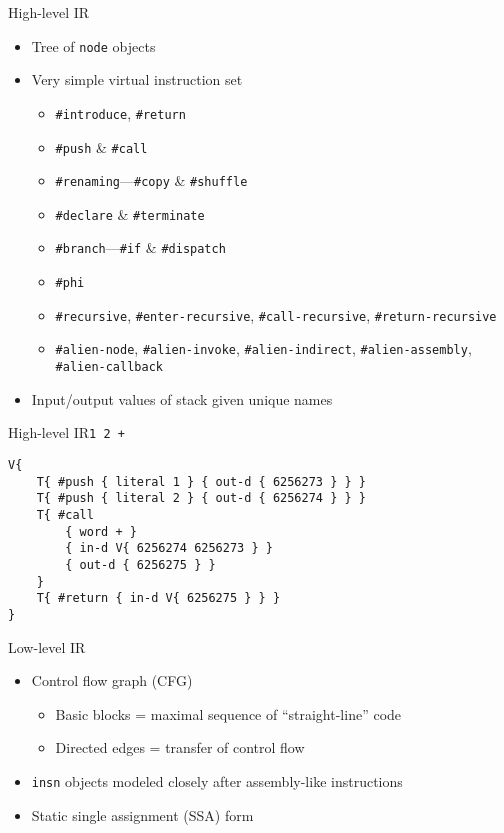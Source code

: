 \documentclass{beamer}
\begin{document}
\begin{frame}{High-level IR}
  \begin{itemize}
    \item Tree of \texttt{node} objects
    \item Very simple virtual instruction set
    \begin{itemize}
      \item \texttt{\#introduce}, \texttt{\#return}
      \item \texttt{\#push} \& \texttt{\#call}
      \item \texttt{\#renaming}---\texttt{\#copy} \& \texttt{\#shuffle}
      \item \texttt{\#declare} \& \texttt{\#terminate}
      \item \texttt{\#branch}---\texttt{\#if} \& \texttt{\#dispatch}
      \item \texttt{\#phi}
      \item \texttt{\#recursive}, \texttt{\#enter-recursive},
            \texttt{\#call-recursive}, \texttt{\#return-recursive}
      \item \texttt{\#alien-node}, \texttt{\#alien-invoke},
            \texttt{\#alien-indirect}, \texttt{\#alien-assembly},
            \texttt{\#alien-callback}
    \end{itemize}
    \item Input/output values of stack given unique names
  \end{itemize}
\end{frame}

\begin{frame}[fragile]{High-level IR}{\texttt{1~2~+}}
  \begin{example}
    \begin{verbatim}
V{
    T{ #push { literal 1 } { out-d { 6256273 } } }
    T{ #push { literal 2 } { out-d { 6256274 } } }
    T{ #call
        { word + }
        { in-d V{ 6256274 6256273 } }
        { out-d { 6256275 } }
    }
    T{ #return { in-d V{ 6256275 } } }
}
    \end{verbatim}
  \end{example}
\end{frame}

\begin{frame}{Low-level IR}
  \begin{itemize}
    \item Control flow graph (CFG)
    \begin{itemize}
      \item Basic blocks = maximal sequence of ``straight-line'' code
      \item Directed edges = transfer of control flow
    \end{itemize}
    \item \texttt{insn} objects modeled closely after assembly-like
          instructions
    \item \alert{Static single assignment} (SSA) form
  \end{itemize}
\end{frame}
\end{document}
